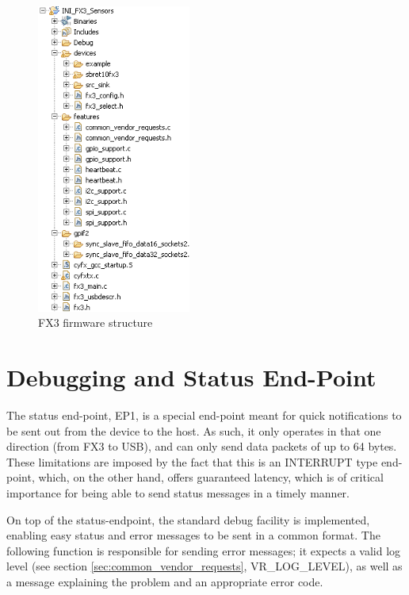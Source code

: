 \documentclass[a4paper,12pt]{report}
\begin{document}
\begin{figure}[H]
\begin{center}
\includegraphics[width=0.45\textwidth]{fx3_fw_structure}
\caption{FX3 firmware structure}
\label{fig:fx3_fw_structure}
\end{center}
\end{figure}

\section{Debugging and Status End-Point} \label{sec:debugging_status_end-point}

The status end-point, EP1, is a special end-point meant for quick notifications to be sent out from the device to the host. As such, it only operates in that one direction (from FX3 to USB), and can only send data packets of up to 64 bytes. These limitations are imposed by the fact that this is an INTERRUPT type end-point, which, on the other hand, offers guaranteed latency, which is of critical importance for being able to send status messages in a timely manner.

On top of the status-endpoint, the standard debug facility is implemented, enabling easy status and error messages to be sent in a common format. The following function is responsible for sending error messages; it expects a valid log level (see section \ref{sec:common_vendor_requests}, VR\_LOG\_LEVEL), as well as a message explaining the problem and an appropriate error code.
\end{document}

